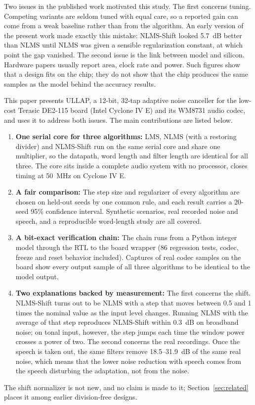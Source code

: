 Two issues in the published work motivated this study. The first concerns tuning. Competing variants are
seldom tuned with equal care, so a reported gain can come from a weak baseline rather than from the
algorithm. An early version of the present work made exactly this mistake: NLMS-Shift looked 5.7~dB
better than NLMS until NLMS was given a sensible regularization constant, at which point the gap
vanished. The second issue is the link between model and silicon. Hardware papers usually report area,
clock rate and power. Such figures show that a design fits on the chip; they do not show that the chip
produces the same samples as the model behind the accuracy results.

This paper presents ULLAP, a 12-bit, 32-tap adaptive noise canceller for the low-cost Terasic DE2-115
board (Intel Cyclone IV E) and its WM8731 audio codec, and uses it to address both issues. The main
contributions are listed below.
\begin{enumerate}
\item \textbf{One serial core for three algorithms:} LMS, NLMS (with a restoring divider) and NLMS-Shift
run on the same serial core and share one multiplier, so the datapath, word length and filter length are
identical for all three. The core sits inside a complete audio system with no processor, closes timing at
50~MHz on Cyclone IV E.
\item \textbf{A fair comparison:} The step size and regularizer of every algorithm are chosen on held-out
seeds by one common rule, and each result carries a 20-seed 95\% confidence interval. Synthetic
scenarios, real recorded noise and speech, and a reproducible word-length study are all covered.
\item \textbf{A bit-exact verification chain:} The chain runs from a Python integer model through the RTL
to the board wrapper (86 regression tests, codec, freeze and reset behavior included). Captures of real
codec samples on the board show every output sample of all three algorithms to be identical to the model
output.
\item \textbf{Two explanations backed by measurement:} The first concerns the shift. NLMS-Shift turns out
to be NLMS with a step that moves between 0.5 and 1 times the nominal value as the input level changes.
Running NLMS with the average of that step reproduces NLMS-Shift within 0.3~dB on broadband noise; on
tonal input, however, the step jumps each time the window power crosses a power of two. The second
concerns the real recordings. Once the speech is taken out, the same filters remove 18.5--31.9~dB of the
same real noise, which means that the lower noise reduction with speech comes from the speech disturbing
the adaptation, not from the noise.
\end{enumerate}
The shift normalizer is not new, and no claim is made to it; Section~\ref{sec:related} places it among
earlier division-free designs.


